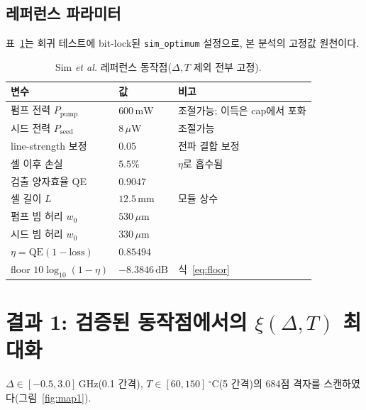 \documentclass[11pt,a4paper]{article}
\newcommand{\dB}{\,\mathrm{dB}}
\newcommand{\GHz}{\,\mathrm{GHz}}
\newcommand{\degC}{\,^{\circ}\mathrm{C}}
\begin{document}
\subsection{레퍼런스 파라미터}
표~\ref{tab:ref}는 회귀 테스트에 bit-lock된 \texttt{sim\_optimum} 설정으로, 본 분석의 고정값
원천이다.

\begin{table}[h]
\centering
\caption{Sim \textit{et al.} 레퍼런스 동작점($\Delta,T$ 제외 전부 고정).}
\label{tab:ref}
\begin{tabular}{lll}
\toprule
변수 & 값 & 비고\\
\midrule
펌프 전력 $P_{\mathrm{pump}}$ & $600\,\mathrm{mW}$ & 조절가능; 이득은 cap에서 포화\\
시드 전력 $P_{\mathrm{seed}}$ & $8\,\mu\mathrm{W}$ & 조절가능\\
line-strength 보정 & $0.05$ & 전파 결합 보정\\
셀 이후 손실 & $5.5\%$ & $\eta$로 흡수됨\\
검출 양자효율 QE & $0.9047$ & \\
셀 길이 $L$ & $12.5\,\mathrm{mm}$ & 모듈 상수\\
펌프 빔 허리 $w_0$ & $530\,\mu\mathrm{m}$ & \\
시드 빔 허리 $w_0$ & $330\,\mu\mathrm{m}$ & \\
\midrule
$\eta=\mathrm{QE}(1-\mathrm{loss})$ & $0.85494$ & \\
floor $10\log_{10}(1-\eta)$ & $-8.3846\dB$ & 식~\eqref{eq:floor}\\
\bottomrule
\end{tabular}
\end{table}

\section{결과 1: 검증된 동작점에서의 $\xi(\Delta,T)$ 최대화}
$\Delta\in[-0.5,3.0]\GHz$(0.1 간격), $T\in[60,150]\degC$(5 간격)의 684점 격자를
스캔하였다(그림~\ref{fig:map1}).
\end{document}
